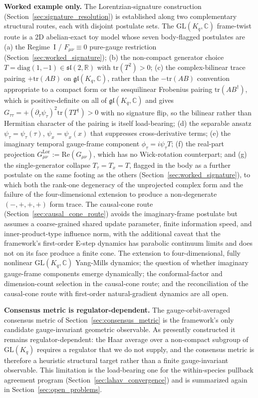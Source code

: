 \documentclass[11pt]{article}
\begin{document}
\textbf{Worked example only.} The Lorentzian-signature construction (Section~\ref{sec:signature_resolution}) is established along two complementary structural routes, each with disjoint postulate sets. The $\mathrm{GL}(K_q,\mathbb{C})$ frame-twist route is a 2D abelian-exact toy model whose seven body-flagged postulates are (a) the Regime~I / $F_{\mu\nu} \equiv 0$ pure-gauge restriction (Section~\ref{sec:worked_signature}); (b) the non-compact generator choice $T = \mathrm{diag}(1,-1) \in \mathfrak{sl}(2,\mathbb{R})$ with $\mathrm{tr}(T^2) > 0$; (c) the complex-bilinear trace pairing $+\mathrm{tr}(AB)$ on $\mathfrak{gl}(K_q,\mathbb{C})$, rather than the $-\mathrm{tr}(AB)$ convention appropriate to a compact form or the sesquilinear Frobenius pairing $\mathrm{tr}(AB^\dagger)$, which is positive-definite on all of $\mathfrak{gl}(K_q,\mathbb{C})$ and gives $G_{\tau\tau} = +(\partial_\tau\psi_\tau)^2\mathrm{tr}(TT^\dagger) > 0$ with no signature flip, so the bilinear rather than Hermitian character of the pairing is itself load-bearing; (d) the separable ansatz $\psi_\tau = \psi_\tau(\tau)$, $\psi_x = \psi_x(x)$ that suppresses cross-derivative terms; (e) the imaginary temporal gauge-frame component $\phi_\tau = i\psi_\tau T$; (f) the real-part projection $G^{\mathrm{Lor}}_{\mu\nu} := \mathrm{Re}(G_{\mu\nu})$, which has no Wick-rotation counterpart; and (g) the single-generator collapse $T_\tau = T_x = T$, flagged in the body as a further postulate on the same footing as the others (Section~\ref{sec:worked_signature}), to which both the rank-one degeneracy of the unprojected complex form and the failure of the four-dimensional extension to produce a non-degenerate $(-,+,+,+)$ form trace. The causal-cone route (Section~\ref{sec:causal_cone_route}) avoids the imaginary-frame postulate but assumes a coarse-grained shared update parameter, finite information speed, and inner-product-type influence norm, with the additional caveat that the framework's first-order E-step dynamics has parabolic continuum limits and does not on its face produce a finite cone. The extension to four-dimensional, fully nonlinear $\mathrm{GL}(K_q,\mathbb{C})$ Yang-Mills dynamics; the question of whether imaginary gauge-frame components emerge dynamically; the conformal-factor and dimension-count selection in the causal-cone route; and the reconciliation of the causal-cone route with first-order natural-gradient dynamics are all open.

\textbf{Consensus metric is regulator-dependent.} The gauge-orbit-averaged consensus metric of Section~\ref{sec:consensus_metric} is the framework's only candidate gauge-invariant geometric observable. As presently constructed it remains regulator-dependent: the Haar average over a non-compact subgroup of $\mathrm{GL}(K_q)$ requires a regulator that we do not supply, and the consensus metric is therefore a heuristic structural target rather than a finite gauge-invariant observable. This limitation is the load-bearing one for the within-species pullback agreement program (Section~\ref{sec:lahav_convergence}) and is summarized again in Section~\ref{sec:open_problems}.
\end{document}
